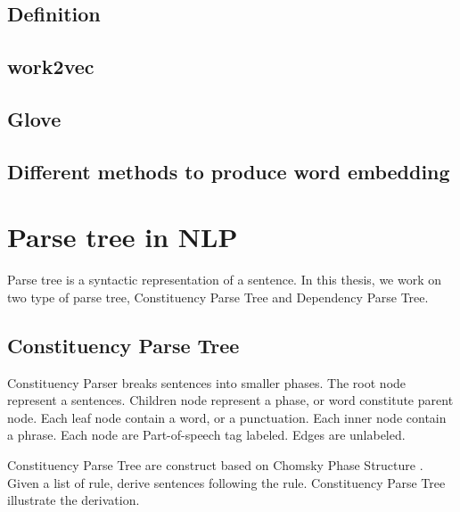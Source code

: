 \subsection{Definition}

\subsection{work2vec}

\subsection{Glove}

\subsection{Different methods to produce word embedding}

\section{Parse tree in NLP}
Parse tree is a syntactic representation of a sentence. In this thesis, we work on two type of parse tree, Constituency Parse Tree and Dependency Parse Tree.
\subsection{Constituency Parse Tree}
Constituency Parser breaks sentences into smaller phases. The root node represent a sentences. Children node represent a phase, or word constitute parent node. Each leaf node contain a word, or a punctuation. Each inner node contain a phrase. Each node are Part-of-speech tag labeled. Edges are unlabeled.

Constituency Parse Tree are construct based on Chomsky Phase Structure \cite{chomsky2002syntactic}. Given a list of rule, derive sentences following the rule. Constituency Parse Tree illustrate the derivation.



